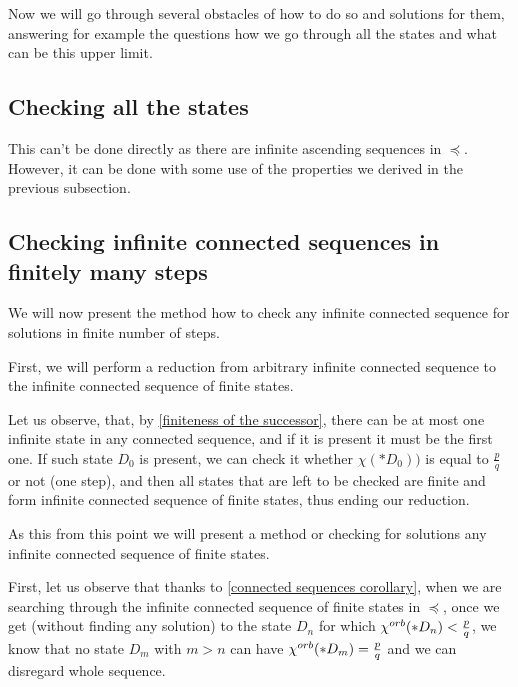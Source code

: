 Now we will go through several obstacles of how to do so and solutions for them, answering for 
example the 
questions how we go through all the states and what can be this upper limit. 


\subsection{Checking all the states}
This can't be done directly as there are infinite ascending sequences in $\preceq$. 
However, it can be done with some use of the properties we derived in the previous subsection.
\subsection{Checking infinite connected sequences in finitely many steps}
\label{searching idea connected}
We will now present the method how to check any infinite connected sequence for solutions 
in finite number of steps.


First, we will perform a reduction from 
arbitrary infinite connected sequence to the infinite connected sequence of finite states. 

Let us observe, that, by \ref{finiteness of the successor}, 
there can be at most one infinite state in 
any connected sequence, and if it is present it must be the first one. If such state 
$D_0$ is present, 
we can check it whether $\chi(*D_0))$ is equal to $\frac{p}{q}$ or not (one step), 
and then all states that are left to be checked are finite and form infinite 
connected sequence of finite states, thus ending our reduction. 

As this from this point we will present a method or checking for solutions any 
infinite connected sequence of finite states.

First, let us observe that thanks to \ref{connected sequences corollary}, 
when we are searching through the infinite connected sequence of finite states in 
$\preceq$, once we get (without finding any solution) 
to the state $D_n$ for which ${\chi^{orb}(*D_n)} < \frac{p}{q}$, we know 
that no state $D_m$ with $m>n$ can have ${\chi^{orb}(*D_m)} = \frac{p}{q}$ 
and we can disregard whole sequence. 

